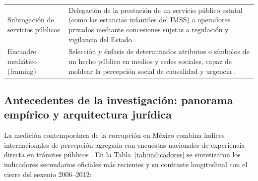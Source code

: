 \begin{table}[H]
\begin{tabular}{@{}p{3.5cm}p{10cm}@{}}
\addlinespace
Subrogación de servicios públicos & Delegación de la prestación de un servicio público estatal (como las estancias infantiles del IMSS) a operadores privados mediante concesiones sujetas a regulación y vigilancia del Estado \citep{leal2010,sernadelagarza2010}. \\
\addlinespace
Encuadre mediático (framing) & Selección y énfasis de determinados atributos o símbolos de un hecho público en medios y redes sociales, capaz de moldear la percepción social de causalidad y urgencia \citep{solamorales2019}. \\
\bottomrule
\end{tabular}
\end{table}

\subsection{Antecedentes de la investigación: panorama empírico y arquitectura jurídica}

La medición contemporánea de la corrupción en México combina índices internacionales de percepción agregada con encuestas nacionales de experiencia directa en trámites públicos \citep{reyesheroles2003,zaid2019}. En la Tabla~\ref{tab:indicadores} se sintetizaron los indicadores secundarios oficiales más recientes y su contraste longitudinal con el cierre del sexenio 2006--2012:

